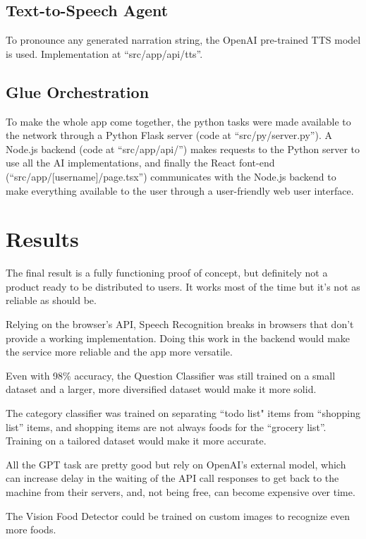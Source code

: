 \documentclass{article}
\begin{document}
\subsection*{\color{draculayellow}Text-to-Speech Agent}

To pronounce any generated narration string, the OpenAI pre-trained TTS model is used. Implementation at ``src/app/api/tts''.

\subsection*{\color{draculagreen}Glue Orchestration}

To make the whole app come together, the python tasks were made available to the network through a Python Flask server (code at ``src/py/server.py''). A Node.js backend (code at ``src/app/api/'') makes requests to the Python server to use all the AI implementations, and finally the React font-end (``src/app/[username]/page.tsx'') communicates with the Node.js backend to make everything available to the user through a user-friendly web user interface.


\section*{\color{draculagreen}Results}

The final result is a fully functioning proof of concept, but definitely not a product ready to be distributed to users. It works most of the time but it's not as reliable as should be.

Relying on the browser's API, Speech Recognition breaks in browsers that don't provide a working implementation. Doing this work in the backend would make the service more reliable and the app more versatile.

Even with 98\% accuracy, the Question Classifier was still trained on a small dataset and a larger, more diversified dataset would make it more solid.

The category classifier was trained on separating ``todo list" items from ``shopping list'' items, and shopping items are not always foods for the ``grocery list''. Training on a tailored dataset would make it more accurate.

All the GPT task are pretty good but rely on OpenAI's external model, which can increase delay in the waiting of the API call responses to get back to the machine from their servers, and, not being free, can become expensive over time.

The Vision Food Detector could be trained on custom images to recognize even more foods.
\end{document}

